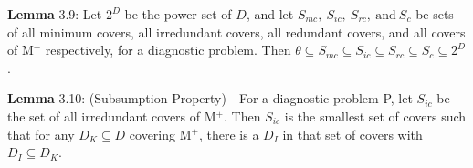 \documentclass{article}
\begin{document}
\par 
\textbf{Lemma} 3.9: Let $2^D$ be the power set of $D$, and let $S_{mc},\
S_{ic},\ S_{rc},\ \text{and}\ S_c$ be sets of all minimum covers, all
irredundant covers, all redundant covers, and all covers of M$^{+}$
respectively, for a diagnostic problem. Then $\theta \subseteq S_{mc}
\subseteq S_{ic} \subseteq S_{rc} \subseteq S_c \subseteq 2^D$.
\newline

\par 
\textbf{Lemma} 3.10: (Subsumption Property) - For a diagnostic problem P, let
$S_{ic}$ be the set of all irredundant covers of M$^{+}$. Then $S_{ic}$ is the
smallest set of covers such that for any $D_K \subseteq D$ covering M$^{+}$,
there is a $D_I$ in that set of covers with $D_I \subseteq D_K$.
\newline
\end{document}
